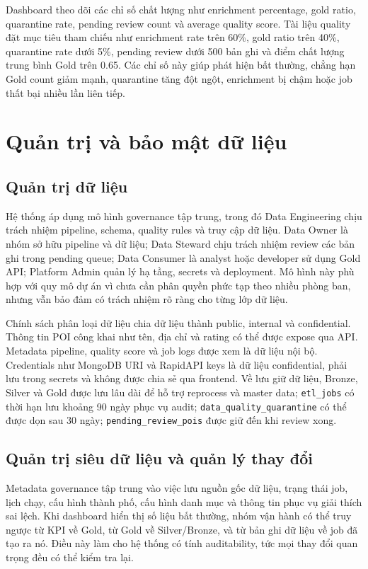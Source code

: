 \documentclass[12pt,a4paper]{article}
\begin{document}
Dashboard theo dõi các chỉ số chất lượng như enrichment percentage, gold ratio, quarantine rate, pending review count và average quality score. Tài liệu quality đặt mục tiêu tham chiếu như enrichment rate trên 60\%, gold ratio trên 40\%, quarantine rate dưới 5\%, pending review dưới 500 bản ghi và điểm chất lượng trung bình Gold trên 0.65. Các chỉ số này giúp phát hiện bất thường, chẳng hạn Gold count giảm mạnh, quarantine tăng đột ngột, enrichment bị chậm hoặc job thất bại nhiều lần liên tiếp.

\section{Quản trị và bảo mật dữ liệu}

\subsection{Quản trị dữ liệu}

Hệ thống áp dụng mô hình governance tập trung, trong đó Data Engineering chịu trách nhiệm pipeline, schema, quality rules và truy cập dữ liệu. Data Owner là nhóm sở hữu pipeline và dữ liệu; Data Steward chịu trách nhiệm review các bản ghi trong pending queue; Data Consumer là analyst hoặc developer sử dụng Gold API; Platform Admin quản lý hạ tầng, secrets và deployment. Mô hình này phù hợp với quy mô dự án vì chưa cần phân quyền phức tạp theo nhiều phòng ban, nhưng vẫn bảo đảm có trách nhiệm rõ ràng cho từng lớp dữ liệu.

Chính sách phân loại dữ liệu chia dữ liệu thành public, internal và confidential. Thông tin POI công khai như tên, địa chỉ và rating có thể được expose qua API. Metadata pipeline, quality score và job logs được xem là dữ liệu nội bộ. Credentials như MongoDB URI và RapidAPI keys là dữ liệu confidential, phải lưu trong secrets và không được chia sẻ qua frontend. Về lưu giữ dữ liệu, Bronze, Silver và Gold được lưu lâu dài để hỗ trợ reprocess và master data; \texttt{etl\_jobs} có thời hạn lưu khoảng 90 ngày phục vụ audit; \texttt{data\_quality\_quarantine} có thể được dọn sau 30 ngày; \texttt{pending\_review\_pois} được giữ đến khi review xong.

\subsection{Quản trị siêu dữ liệu và quản lý thay đổi}

Metadata governance tập trung vào việc lưu nguồn gốc dữ liệu, trạng thái job, lịch chạy, cấu hình thành phố, cấu hình danh mục và thông tin phục vụ giải thích sai lệch. Khi dashboard hiển thị số liệu bất thường, nhóm vận hành có thể truy ngược từ KPI về Gold, từ Gold về Silver/Bronze, và từ bản ghi dữ liệu về job đã tạo ra nó. Điều này làm cho hệ thống có tính auditability, tức mọi thay đổi quan trọng đều có thể kiểm tra lại.
\end{document}
